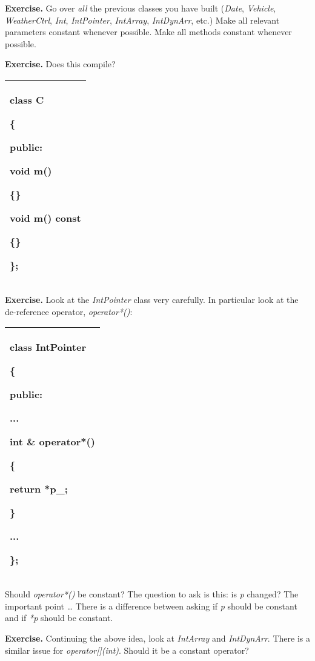 \documentclass[
]{article}
\begin{document}
\textbf{Exercise.} Go over \emph{all} the previous classes you have
built (\emph{Date}, \emph{Vehicle}, \emph{WeatherCtrl}, \emph{Int},
\emph{IntPointer}, \emph{IntArray}, \emph{IntDynArr}, etc.) Make all
relevant parameters constant whenever possible. Make all methods
constant whenever possible.

\textbf{Exercise. }Does this compile?

\begin{longtable}[]{@{}l@{}}
\toprule
\endhead
\begin{minipage}[t]{0.97\columnwidth}\raggedright
class C

\{

public:

void m()

\{\}

void m() const

\{\}

\};\strut
\end{minipage}\tabularnewline
\bottomrule
\end{longtable}

\textbf{Exercise. }Look at the \emph{IntPointer} class very carefully.
In particular look at the de-reference operator, \emph{operator*()}:

\begin{longtable}[]{@{}l@{}}
\toprule
\endhead
\begin{minipage}[t]{0.97\columnwidth}\raggedright
class IntPointer

\{

public:

...

int \& operator*()

\{

return *p\_;

\}

...

\};\strut
\end{minipage}\tabularnewline
\bottomrule
\end{longtable}

Should \emph{operator*()} be constant? The question to ask is this: is
\emph{p} changed? The important point \ldots{} There is a difference
between asking if \emph{p} should be constant and if \emph{*p} should be
constant.

\textbf{Exercise.} Continuing the above idea, look at \emph{IntArray}
and \emph{IntDynArr}. There is a similar issue for
\emph{operator{[}{]}(int)}. Should it be a constant operator?
\end{document}
